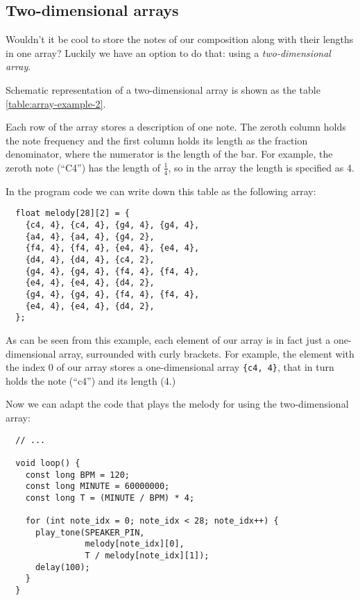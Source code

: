 \documentclass[../sparc.tex]{subfiles}
\begin{document}
\newpage
\subsection{Two-dimensional arrays}

Wouldn't it be cool to store the notes of our composition along with their
lengths in one array?  Luckily we have an option to do that: using a
\emph{two-dimensional array}.

Schematic representation of a two-dimensional array is shown as the table
\ref{table:array-example-2}.


Each row of the array stores a description of one note.  The zeroth column holds
the note frequency and the first column holds its length as the fraction
denominator, where the numerator is the length of the bar.  For example, the
zeroth note (``C4'') has the length of $\frac{1}{4}$, so in the array the length
is specified as 4.

In the program code we can write down this table as the following array:

\begin{verbatim}
  float melody[28][2] = {
    {c4, 4}, {c4, 4}, {g4, 4}, {g4, 4},
    {a4, 4}, {a4, 4}, {g4, 2},
    {f4, 4}, {f4, 4}, {e4, 4}, {e4, 4},
    {d4, 4}, {d4, 4}, {c4, 2},
    {g4, 4}, {g4, 4}, {f4, 4}, {f4, 4},
    {e4, 4}, {e4, 4}, {d4, 2},
    {g4, 4}, {g4, 4}, {f4, 4}, {f4, 4},
    {e4, 4}, {e4, 4}, {d4, 2},
  };
\end{verbatim}

As can be seen from this example, each element of our array is in fact just a
one-dimensional array, surrounded with curly brackets.  For example, the element
with the index 0 of our array stores a one-dimensional array \texttt{\{c4, 4\}},
that in turn holds the note (``c4'') and its length (4.)

Now we can adapt the code that plays the melody for using the two-dimensional
array:

\begin{verbatim}
  // ...

  void loop() {
    const long BPM = 120;
    const long MINUTE = 60000000;
    const long T = (MINUTE / BPM) * 4;

    for (int note_idx = 0; note_idx < 28; note_idx++) {
      play_tone(SPEAKER_PIN,
                melody[note_idx][0],
                T / melody[note_idx][1]);
      delay(100);
    }
  }
\end{verbatim}
\end{document}
